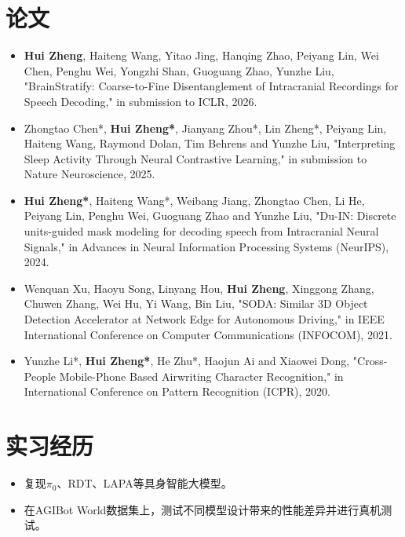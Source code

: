 \documentclass{resume}
\begin{document}
\section{{\bfseries 论文}}
\begin{itemize}[parsep=0.2ex]
  \item \textbf{Hui Zheng}, Haiteng Wang, Yitao Jing, Hanqing Zhao, Peiyang Lin, Wei Chen, Penghu Wei, Yongzhi Shan, Guoguang Zhao, Yunzhe Liu, "BrainStratify: Coarse-to-Fine Disentanglement of Intracranial Recordings for Speech Decoding," in submission to ICLR, 2026.
  \item Zhongtao Chen*, \textbf{Hui Zheng*}, Jianyang Zhou*, Lin Zheng*, Peiyang Lin, Haiteng Wang, Raymond Dolan, Tim Behrens and Yunzhe Liu, "Interpreting Sleep Activity Through Neural Contrastive Learning," in submission to Nature Neuroscience, 2025.
  \item \textbf{Hui Zheng*}, Haiteng Wang*, Weibang Jiang, Zhongtao Chen, Li He, Peiyang Lin, Penghu Wei, Guoguang Zhao and Yunzhe Liu, "Du-IN: Discrete units-guided mask modeling for decoding speech from Intracranial Neural Signals," in Advances in Neural Information Processing Systems (NeurIPS), 2024.
  \item Wenquan Xu, Haoyu Song, Linyang Hou, \textbf{Hui Zheng}, Xinggong Zhang, Chuwen Zhang, Wei Hu, Yi Wang, Bin Liu, "SODA: Similar 3D Object Detection Accelerator at Network Edge for Autonomous Driving," in IEEE International Conference on Computer Communications (INFOCOM), 2021.
  \item Yunzhe Li*, \textbf{Hui Zheng*}, He Zhu*, Haojun Ai and Xiaowei Dong, "Cross-People Mobile-Phone Based Airwriting Character Recognition," in International Conference on Pattern Recognition (ICPR), 2020.
\end{itemize}

\section{{\bfseries 实习经历}}
\begin{itemize}[parsep=0.2ex]
  \item 复现$\pi_{0}$、RDT、LAPA等具身智能大模型。
  \item 在AGIBot World数据集上，测试不同模型设计带来的性能差异并进行真机测试。
\end{itemize}
\end{document}

